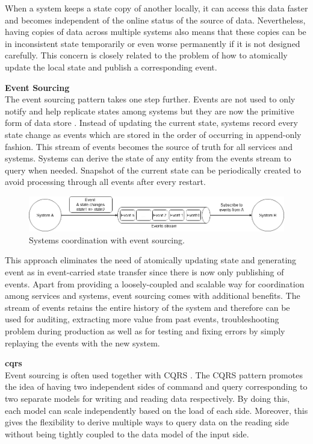 When a system keeps a state copy of another locally, it can access this data faster and becomes independent of the online status of the source of data. Nevertheless, having copies of data across multiple systems also means that these copies can be in inconsistent state temporarily or even worse permanently if it is not designed carefully. This concern is closely related to the problem of how to atomically update the local state and publish a corresponding event.

\textbf{Event Sourcing}\\
The event sourcing pattern takes one step further. Events are not used to only notify and help replicate states among systems but they are now the primitive form of data store \cite{eventsourcingfowler}. Instead of updating the current state, systems record every state change as events which are stored in the order of occurring in append-only fashion. This stream of events becomes the source of truth for all services and systems. Systems can derive the state of any entity from the events stream to query when needed. Snapshot of the current state can be periodically created to avoid processing through all events after every restart.

\begin{figure}[h]
	\includegraphics[width=\linewidth]{images/eventsourcing.png}
	\caption{Systems coordination with event sourcing.}
	\label{fig:eventsourcing}
\end{figure}

This approach eliminates the need of atomically updating state and generating event as in event-carried state transfer since there is now only publishing of events. Apart from providing a loosely-coupled and scalable way for coordination among services and systems, event sourcing comes with additional benefits. The stream of events retains the entire history of the system and therefore can be used for auditing, extracting more value from past events, troubleshooting problem during production as well as for testing and fixing errors by simply replaying the events with the new system.

\textbf{\acrfull{cqrs}}\\
Event sourcing is often used together with CQRS \cite{cqrsgregyoung}. The CQRS pattern promotes the idea of having two independent sides of command and query corresponding to two separate models for writing and reading data respectively. By doing this, each model can scale independently based on the load of each side. Moreover, this gives the flexibility to derive multiple ways to query data on the reading side without being tightly coupled to the data model of the input side. 

